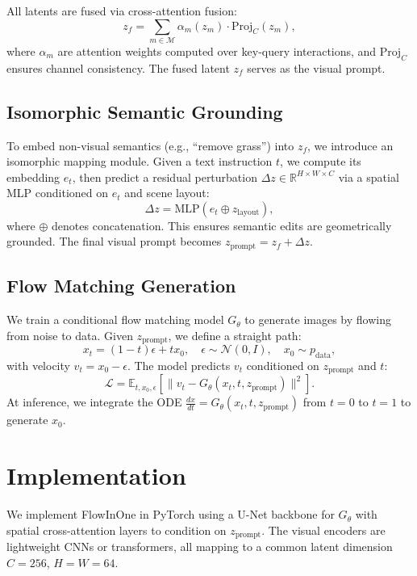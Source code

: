 \documentclass[11pt,a4paper]{article}
\begin{document}
All latents are fused via cross-attention fusion:
\begin{equation}
    z_f = \sum_{m \in \mathcal{M}} \alpha_m(z_m) \cdot \text{Proj}_C(z_m),
\end{equation}
where $\alpha_m$ are attention weights computed over key-query interactions, and $\text{Proj}_C$ ensures channel consistency. The fused latent $z_f$ serves as the visual prompt.

\subsection{Isomorphic Semantic Grounding}
To embed non-visual semantics (e.g., “remove grass”) into $z_f$, we introduce an isomorphic mapping module. Given a text instruction $t$, we compute its embedding $e_t$, then predict a residual perturbation $\Delta z \in \mathbb{R}^{H \times W \times C}$ via a spatial MLP conditioned on $e_t$ and scene layout:
\begin{equation}
    \Delta z = \text{MLP}(e_t \oplus z_{\text{layout}}),
\end{equation}
where $\oplus$ denotes concatenation. This ensures semantic edits are geometrically grounded. The final visual prompt becomes $z_{\text{prompt}} = z_f + \Delta z$.

\subsection{Flow Matching Generation}
We train a conditional flow matching model $G_\theta$ to generate images by flowing from noise to data. Given $z_{\text{prompt}}$, we define a straight path:
\begin{equation}
    x_t = (1 - t) \epsilon + t x_0, \quad \epsilon \sim \mathcal{N}(0, I), \quad x_0 \sim p_{\text{data}},
\end{equation}
with velocity $v_t = x_0 - \epsilon$. The model predicts $v_t$ conditioned on $z_{\text{prompt}}$ and $t$:
\begin{equation}
    \mathcal{L} = \mathbb{E}_{t,x_0,\epsilon} \left[ \| v_t - G_\theta(x_t, t, z_{\text{prompt}}) \|^2 \right].
\end{equation}
At inference, we integrate the ODE $\frac{dx}{dt} = G_\theta(x_t, t, z_{\text{prompt}})$ from $t=0$ to $t=1$ to generate $x_0$.

\section{Implementation}
We implement FlowInOne in PyTorch using a U-Net backbone for $G_\theta$ with spatial cross-attention layers to condition on $z_{\text{prompt}}$. The visual encoders are lightweight CNNs or transformers, all mapping to a common latent dimension $C=256$, $H=W=64$.
\end{document}

